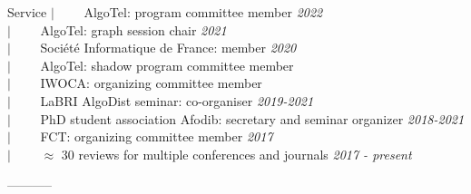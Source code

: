 \documentclass[french]{resume} %
\begin{document}
\begin{rSection}{Service} %
$| \qquad$ AlgoTel: program committee member \hfill {\em 2022} \\
$| \qquad$ AlgoTel: graph session chair \hfill {\em 2021} \\
$| \qquad$ Société Informatique de France: member \hfill {\em 2020} \\
$| \qquad$ AlgoTel: shadow program committee member \\
$| \qquad$ IWOCA: organizing committee member \\
$| \qquad$ LaBRI AlgoDist seminar: co-organiser \hfill {\em 2019-2021}\\
$| \qquad$ PhD student association Afodib: secretary and seminar organizer \hfill {\em 2018-2021}\\
$| \qquad$ FCT: organizing committee member \hfill {\em 2017}\\
$| \qquad$ $\approx$ 30 reviews for multiple conferences and journals \hfill {\em 2017 - present}\\
\end{rSection}

%


\begin{center}
-----------
\end{center}
\end{document}
